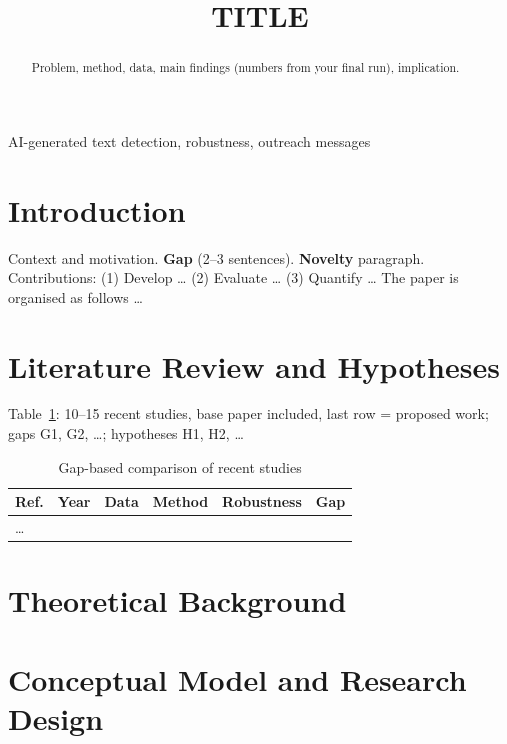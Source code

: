 \documentclass[conference]{IEEEtran} %
\begin{document}
\title{TITLE}
\author{}
\maketitle
\begin{abstract}
Problem, method, data, main findings (numbers from your final run), implication.
\end{abstract}
\begin{IEEEkeywords}AI-generated text detection, robustness, outreach messages\end{IEEEkeywords}

\section{Introduction}
Context and motivation. \textbf{Gap} (2--3 sentences). \textbf{Novelty} paragraph.
Contributions: (1) Develop \dots{} (2) Evaluate \dots{} (3) Quantify \dots{}
The paper is organised as follows \dots

\section{Literature Review and Hypotheses}
Table~\ref{tab:gap}: 10--15 recent studies, base paper included, last row = proposed work; gaps G1, G2, \dots; hypotheses H1, H2, \dots
\begin{table}[t]\caption{Gap-based comparison of recent studies}\label{tab:gap}\centering
\begin{tabular}{@{}llllll@{}}\toprule
Ref. & Year & Data & Method & Robustness & Gap\\ \midrule
\dots & & & & & \\ \bottomrule\end{tabular}\end{table}

\section{Theoretical Background}
\section{Conceptual Model and Research Design}
\end{document}
